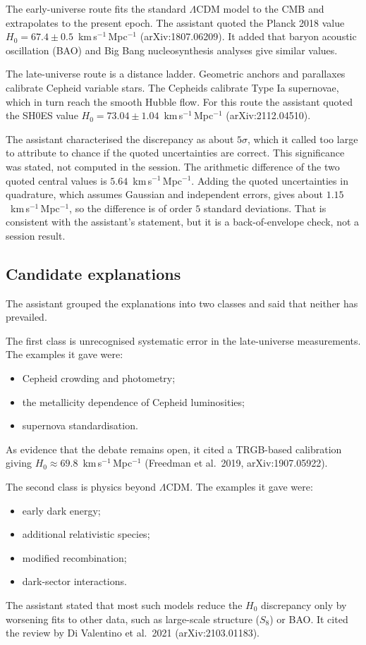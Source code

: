 \documentclass[11pt,a4paper]{article}
\begin{document}
The early-universe route fits the standard $\Lambda$CDM model to the CMB and extrapolates to the present epoch. The assistant quoted the Planck 2018 value $H_0 = 67.4 \pm 0.5$~km\,s$^{-1}$\,Mpc$^{-1}$ (arXiv:1807.06209). It added that baryon acoustic oscillation (BAO) and Big Bang nucleosynthesis analyses give similar values.

The late-universe route is a distance ladder. Geometric anchors and parallaxes calibrate Cepheid variable stars. The Cepheids calibrate Type Ia supernovae, which in turn reach the smooth Hubble flow. For this route the assistant quoted the SH0ES value $H_0 = 73.04 \pm 1.04$~km\,s$^{-1}$\,Mpc$^{-1}$ (arXiv:2112.04510).

The assistant characterised the discrepancy as about $5\sigma$, which it called too large to attribute to chance if the quoted uncertainties are correct. This significance was stated, not computed in the session. The arithmetic difference of the two quoted central values is $5.64$~km\,s$^{-1}$\,Mpc$^{-1}$. Adding the quoted uncertainties in quadrature, which assumes Gaussian and independent errors, gives about $1.15$~km\,s$^{-1}$\,Mpc$^{-1}$, so the difference is of order $5$ standard deviations. That is consistent with the assistant's statement, but it is a back-of-envelope check, not a session result.

\subsection{Candidate explanations}
The assistant grouped the explanations into two classes and said that neither has prevailed.

The first class is unrecognised systematic error in the late-universe measurements. The examples it gave were:
\begin{itemize}
\item Cepheid crowding and photometry;
\item the metallicity dependence of Cepheid luminosities;
\item supernova standardisation.
\end{itemize}
As evidence that the debate remains open, it cited a TRGB-based calibration giving $H_0 \approx 69.8$~km\,s$^{-1}$\,Mpc$^{-1}$ (Freedman et al.\ 2019, arXiv:1907.05922).

The second class is physics beyond $\Lambda$CDM. The examples it gave were:
\begin{itemize}
\item early dark energy;
\item additional relativistic species;
\item modified recombination;
\item dark-sector interactions.
\end{itemize}
The assistant stated that most such models reduce the $H_0$ discrepancy only by worsening fits to other data, such as large-scale structure ($S_8$) or BAO. It cited the review by Di Valentino et al.\ 2021 (arXiv:2103.01183).
\end{document}
